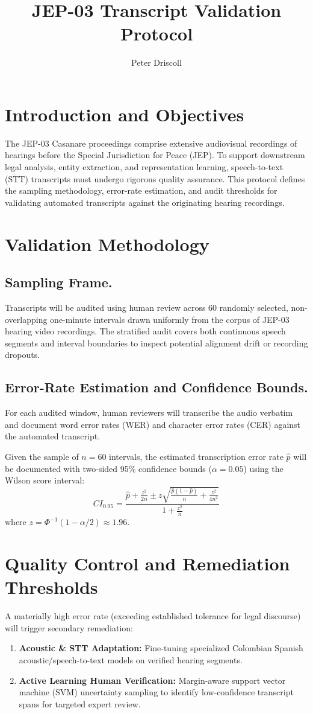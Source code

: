 \documentclass{article}
\title{JEP-03 Transcript Validation Protocol}
\author{Peter Driscoll}
\begin{document}
\maketitle

\section{Introduction and Objectives}
The JEP-03 Casanare proceedings comprise extensive audiovisual recordings of hearings before the Special Jurisdiction for Peace (JEP). To support downstream legal analysis, entity extraction, and representation learning, speech-to-text (STT) transcripts must undergo rigorous quality assurance. This protocol defines the sampling methodology, error-rate estimation, and audit thresholds for validating automated transcripts against the originating hearing recordings.

\section{Validation Methodology}
\subsection{Sampling Frame.}
Transcripts will be audited using human review across 60 randomly selected, non-overlapping one-minute intervals drawn uniformly from the corpus of JEP-03 hearing video recordings. The stratified audit covers both continuous speech segments and interval boundaries to inspect potential alignment drift or recording dropouts.

\subsection{Error-Rate Estimation and Confidence Bounds.}
For each audited window, human reviewers will transcribe the audio verbatim and document word error rates (WER) and character error rates (CER) against the automated transcript. 

Given the sample of $n = 60$ intervals, the estimated transcription error rate $\hat{p}$ will be documented with two-sided 95\% confidence bounds ($\alpha = 0.05$) using the Wilson score interval:
\[
CI_{0.95} = \frac{\hat{p} + \frac{z^2}{2n} \pm z \sqrt{\frac{\hat{p}(1-\hat{p})}{n} + \frac{z^2}{4n^2}}}{1 + \frac{z^2}{n}}
\]
where $z = \Phi^{-1}(1 - \alpha/2) \approx 1.96$.

\section{Quality Control and Remediation Thresholds}
A materially high error rate (exceeding established tolerance for legal discourse) will trigger secondary remediation:
\begin{enumerate}
    \item \textbf{Acoustic \& STT Adaptation:} Fine-tuning specialized Colombian Spanish acoustic/speech-to-text models on verified hearing segments.
    \item \textbf{Active Learning Human Verification:} Margin-aware support vector machine (SVM) uncertainty sampling to identify low-confidence transcript spans for targeted expert review.
\end{enumerate}
\end{document}
